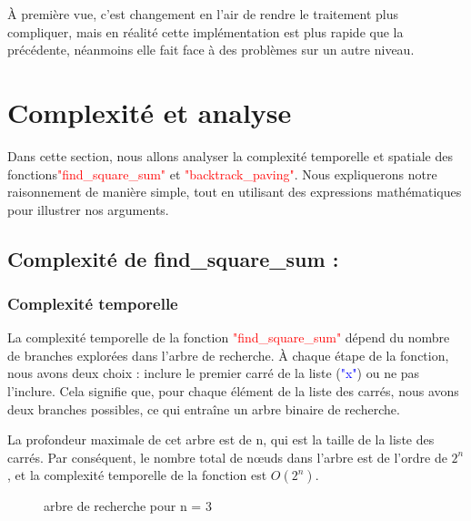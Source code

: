 \documentclass{article}
\begin{document}
À première vue, c'est changement en l'air de rendre le traitement plus compliquer, mais en réalité cette implémentation est plus rapide que la précédente, néanmoins elle fait face à des problèmes sur un autre niveau.





\section{Complexité et analyse}

Dans cette section, nous allons analyser la complexité temporelle et spatiale des fonctions\newline \textcolor{red}{"find\_square\_sum"} et \textcolor{red}{"backtrack\_paving"}. Nous expliquerons notre raisonnement de manière simple, tout en utilisant des expressions mathématiques pour illustrer nos arguments.

\subsection{ Complexité de find\_square\_sum :}
\subsubsection{Complexité temporelle}
La complexité temporelle de la fonction \textcolor{red}{"find\_square\_sum"} dépend du nombre de branches explorées dans l'arbre de recherche. À chaque étape de la fonction, nous avons deux choix : inclure le premier carré de la liste (\textcolor{blue}{"x"}) ou ne pas l'inclure. Cela signifie que, pour chaque élément de la liste des carrés, nous avons deux branches possibles, ce qui entraîne un arbre binaire de recherche.\newline

La profondeur maximale de cet arbre est de n, qui est la taille de la liste des carrés. Par conséquent, le nombre total de nœuds dans l'arbre est de l'ordre de $2^n$, et la complexité temporelle de la fonction est $O(2^n)$.

\begin{figure}[htbp]
    \centering
    \caption{arbre de recherche pour n = 3}
    \label{fig1}
\end{figure}
\end{document}
